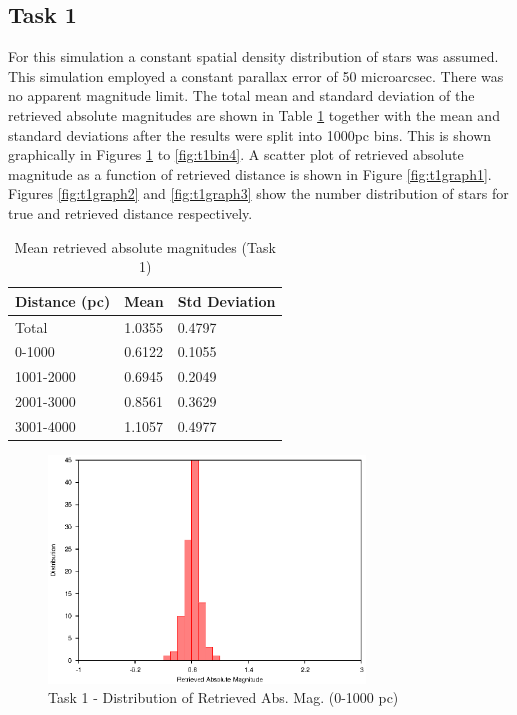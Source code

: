 \documentclass[a4paper,12pt]{article}
\begin{document}
\subsection{Task 1}
For this simulation a constant spatial density distribution of stars was assumed. This simulation employed a constant parallax error of 50 microarcsec. There was no apparent magnitude limit. The total mean and standard deviation of the retrieved absolute magnitudes are shown in Table \ref{tab:task1} together with the mean and standard deviations after the results were split into 1000pc bins. This is shown graphically in Figures \ref{fig:t1bin1} to \ref{fig:t1bin4}. A scatter plot of retrieved absolute magnitude as a function of retrieved distance is shown in Figure \ref{fig:t1graph1}. Figures \ref{fig:t1graph2} and \ref{fig:t1graph3} show the number distribution of stars for true and retrieved distance respectively.

\begin{table}[ht]
\centering
\begin{tabular}{|l|l|l|}
\hline
Distance (pc) & Mean & Std Deviation \\
\hline
Total & 1.0355 & 0.4797 \\
0-1000 & 0.6122 & 0.1055 \\
1001-2000 & 0.6945 & 0.2049 \\
2001-3000 & 0.8561 & 0.3629 \\
3001-4000 & 1.1057 & 0.4977 \\
\hline
\end{tabular}
\caption{\label{tab:task1}Mean retrieved absolute magnitudes (Task 1)}
\end{table}

\begin{figure}[H]
\centering
\includegraphics[width=0.75\textwidth]{./Task1/Bin1}
\caption{Task 1 -  Distribution of Retrieved Abs. Mag. (0-1000 pc)}
\label{fig:t1bin1}
\end{figure}
\end{document}

